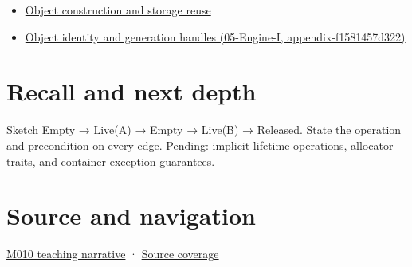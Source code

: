 \begin{itemize}
\tightlist
\item
  \hyperref[appendix-a82f9c438857]{Object construction and storage reuse}
\item
  \href{../05-Engine-I/main.pdf\#nameddest=appendix-f1581457d322}{Object identity and generation handles (05-Engine-I, appendix-f1581457d322)}
\end{itemize}

\section{Recall and next depth}\label{appendix-f56c3e43fd4e-recall-and-next-depth}

Sketch Empty → Live(A) → Empty → Live(B) → Released. State the operation and precondition on every edge. Pending: implicit-lifetime operations, allocator traits, and container exception guarantees.

\section{Source and navigation}\label{appendix-f56c3e43fd4e-source-and-navigation}

\href{Continuous\%20Notes/Computing\%20Foundations\%20-\%20From\%20Bits\%20to\%20C++\%20and\%20Systems\%20APIs\#Placement\%20construction\%20reuses\%20storage;\%20it\%20does\%20not\%20allocate\%20it}{M010 teaching narrative} · \hyperref[appendix-fd090d982a15-m010---parts-148-160]{Source coverage}
